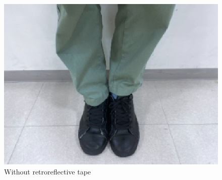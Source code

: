   \begin{figure}[h]
    \centering
    \includegraphics[keepaspectratio, scale=0.55] {images/eps/RobotGuidance_following_phase_leg}
    \captionsetup{justification=raggedright} %
    \caption{Without retroreflective tape}
    \label{Fig:RobotGuidance_following_phase_leg}
  \end{figure}

\newpage
